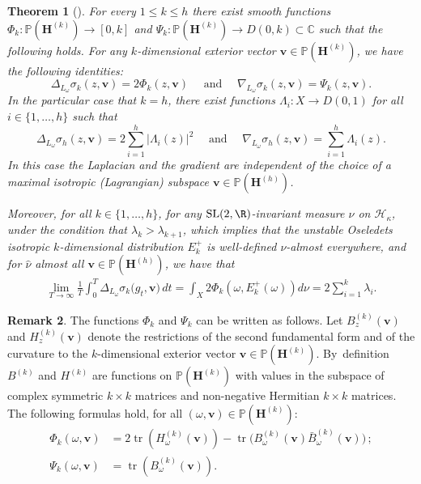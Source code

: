 \documentclass[JEP,XML,SOM,Unicode,published]{cedram}
\DeclareMathOperator{\tr}{tr}
\theoremstyle{plain}
\newtheorem{thm}{Theorem}[section]
\theoremstyle{definition}
\newtheorem{rem}[thm]{Remark}
\numberwithin{equation}{subsection}
\newcommand\bC{\mathbb{C}}\let\C\bC
\newcommand\bP{\mathbb{P}}
\newcommand\cH{\mathcal{H}}
\newcommand{\SL}{\mathrm{SL}}
\let\gradient\nabla
\let\laplacian\Delta
\newcommand{\bfH}{\boldsymbol{H}}
\newcommand{\bfv}{\boldsymbol{v}}
\begin{document}
\begin{thm}[\cite{For02, FMZ12}]\label{det} For every $1\leq k\leq h$
there exist smooth functions $\Phi_k:\bP(\bfH^{(k)}) \to [0,k]$ and $\Psi_k :\bP(\bfH^{(k)}) \to D(0,k) \subset \bC$ such that the following holds.
For any $k$-dimensional exterior vector $\bfv \in \bP(\bfH^{(k)})$, we have the following identities:\vspace*{-3pt}
\begin{equation}
\laplacian_{L_\omega} \sigma_k(z,\bfv) = 2\Phi_k (z, \bfv)\quad \text{ and } \quad
\gradient_{L_\omega} \sigma_k(z,\bfv) = \Psi_k (z, \bfv).\label{laplacianformula}
\end{equation}
In the particular case that $k=h$, there exist functions
$\Lambda_i: X \to D(0,1)$ for all $i\in \{1, \dots, h\}$ such that\vspace*{-3pt}
\[
\laplacian_{L_\omega} \sigma_h(z,\bfv) = 2 \sum_{i=1}^{h} |\Lambda_i(z)|^2 \quad \text{ and } \quad
\gradient_{L_\omega} \sigma_h(z,\bfv) =\sum_{i=1}^{h} \Lambda_i(z).
\]
In this case the Laplacian and the gradient are independent of the choice of a maximal isotropic (Lagrangian) subspace $\bfv\in \bP(\bfH^{(h)})$.

Moreover, for all $k\in \{1, \dots, h\}$, for any $\SL(2,\R)$-invariant measure $\nu$ on $\cH_\kappa$, under the condition that $\lambda_k > \lambda_{k+1}$, which implies that the unstable Oseledets isotropic $k$-dimensional distribution $E^+_k$ is well-defined $\nu$-almost everywhere, and for $\hat \nu$ almost all $\bfv\in \bP(\bfH^{(h)})$, we have that\vspace*{-3pt}
\begin{align*}
\lim_{T\to\infty} \frac{1}{T}\int_0^T \laplacian_{L_\omega} \sigma_k\big(g_t,\bfv\big) \, dt = \int_X 2\Phi_k
(\omega, E^+_k(\omega)) d\nu = 2\sum_{i=1}^k \lambda_i.
\end{align*}
\end{thm}
\begin{rem}
The functions $\Phi_k$ and $\Psi_k$ can be written as follows.
Let $B^{(k)}_z({\bfv})$ and $H^{(k)}_z({\bfv})$ denote the
restrictions of the second fundamental form and of the curvature to the $k$-dimensional exterior vector ${\bfv} \in \bP(\bfH^{(k)})$. By~definition $B^{(k)}$ and $H^{(k)}$ are functions on $\bP(\bfH^{(k)})$ with values in the subspace of complex symmetric $k\times k$ matrices and non-negative Hermitian $k\times k$ matrices. The following formulas hold, for all $(\omega,{\bfv})\in \bP(\bfH^{(k)})$:\vspace*{-3pt}
\begin{equation}
\label{eq:PhiPsi}
\begin{aligned}
\Phi_k (\omega, \bfv)&= 2\tr (H^{(k)}_\omega(\bfv))-
\tr \bigl(B^{(k)}_\omega(\bfv) \bar B^{(k)}_\omega (\bfv)\bigr)\,;\\
\Psi_k (\omega, \bfv)&= \tr(B^{(k)}_\omega(\bfv)).
\end{aligned}
\end{equation}
\end{rem}
\end{document}
